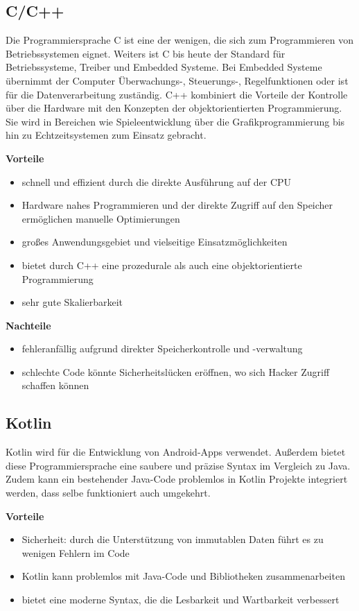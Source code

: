 \subsection{C/C++}
Die Programmiersprache C ist eine der wenigen, die sich zum Programmieren von Betriebssystemen eignet. Weiters ist C bis heute der Standard für Betriebssysteme, Treiber und Embedded Systeme. Bei Embedded Systeme übernimmt der Computer Überwachungs-, Steuerungs-, Regelfunktionen oder ist für die Datenverarbeitung zuständig. C++ kombiniert die Vorteile der Kontrolle über die Hardware mit den Konzepten der objektorientierten Programmierung. Sie wird in Bereichen wie Spieleentwicklung über die Grafikprogrammierung bis hin zu Echtzeitsystemen zum Einsatz gebracht. \parencite{Programmiersprachen}

\textbf{Vorteile}
\begin{itemize}
	\item schnell und effizient durch die direkte Ausführung auf der CPU
	\item Hardware nahes Programmieren und der direkte Zugriff auf den Speicher ermöglichen manuelle Optimierungen
	\item großes Anwendungsgebiet und vielseitige Einsatzmöglichkeiten
	\item bietet durch C++ eine prozedurale als auch eine objektorientierte Programmierung
	\item sehr gute Skalierbarkeit
\end{itemize}

\textbf{Nachteile}
\begin{itemize}
	\item fehleranfällig aufgrund direkter Speicherkontrolle und -verwaltung
	\item schlechte Code könnte Sicherheitslücken eröffnen, wo sich Hacker Zugriff schaffen können
\end{itemize}



\subsection{Kotlin}
Kotlin wird für die Entwicklung von Android-Apps verwendet. Außerdem bietet diese Programmiersprache eine saubere und präzise Syntax im Vergleich zu Java. Zudem kann ein bestehender Java-Code problemlos in Kotlin Projekte integriert werden, dass selbe funktioniert auch umgekehrt. \parencite{Kotlin}

\textbf{Vorteile}
\begin{itemize}
	\item Sicherheit: durch die Unterstützung von immutablen Daten führt es zu wenigen Fehlern im Code
	\item Kotlin kann problemlos mit Java-Code und Bibliotheken zusammenarbeiten
	\item bietet eine moderne Syntax, die die Lesbarkeit und Wartbarkeit verbessert
\end{itemize}

